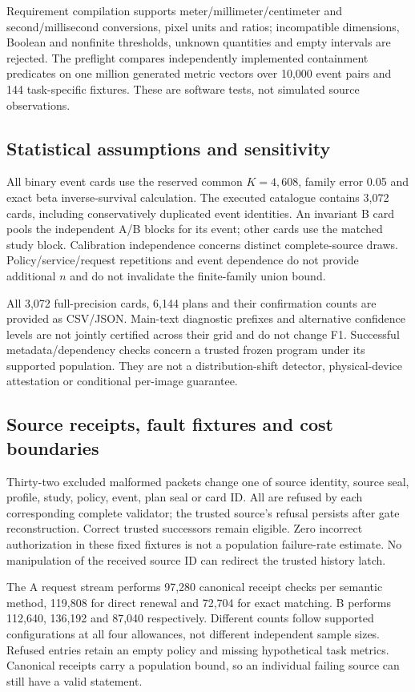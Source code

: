 Requirement compilation supports meter/millimeter/centimeter and second/millisecond conversions, pixel units and ratios; incompatible dimensions, Boolean and nonfinite thresholds, unknown quantities and empty intervals are rejected. The preflight compares independently implemented containment predicates on one million generated metric vectors over 10,000 event pairs and 144 task-specific fixtures. These are software tests, not simulated source observations.

\subsection{Statistical assumptions and sensitivity}
All binary event cards use the reserved common $K=4,608$, family error 0.05 and exact beta inverse-survival calculation. The executed catalogue contains 3,072 cards, including conservatively duplicated event identities. An invariant B card pools the independent A/B blocks for its event; other cards use the matched study block. Calibration independence concerns distinct complete-source draws. Policy/service/request repetitions and event dependence do not provide additional $n$ and do not invalidate the finite-family union bound.

All 3,072 full-precision cards, 6,144 plans and their confirmation counts are provided as CSV/JSON. Main-text diagnostic prefixes and alternative confidence levels are not jointly certified across their grid and do not change F1. Successful metadata/dependency checks concern a trusted frozen program under its supported population. They are not a distribution-shift detector, physical-device attestation or conditional per-image guarantee.

\subsection{Source receipts, fault fixtures and cost boundaries}
Thirty-two excluded malformed packets change one of source identity, source seal, profile, study, policy, event, plan seal or card ID. All are refused by each corresponding complete validator; the trusted source's refusal persists after gate reconstruction. Correct trusted successors remain eligible. Zero incorrect authorization in these fixed fixtures is not a population failure-rate estimate. No manipulation of the received source ID can redirect the trusted history latch.

The A request stream performs 97,280 canonical receipt checks per semantic method, 119,808 for direct renewal and 72,704 for exact matching. B performs 112,640, 136,192 and 87,040 respectively. Different counts follow supported configurations at all four allowances, not different independent sample sizes. Refused entries retain an empty policy and missing hypothetical task metrics. Canonical receipts carry a population bound, so an individual failing source can still have a valid statement.

